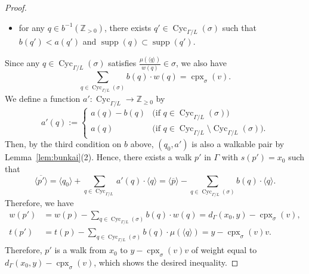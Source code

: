 \begin{proof}
\begin{itemize}
\item
for any $q \in b^{-1}(\mathbb{Z}_{>0})$, 
there exists $q' \in \operatorname{Cyc}_{\Gamma /L}(\sigma)$ 
such that $b(q') < a(q')$ and $\operatorname{supp}(q) \subset \operatorname{supp}(q')$. 
\end{itemize}
Since any $q \in \operatorname{Cyc}_{\Gamma /L}(\sigma)$ satisfies $\frac{\mu(\langle q \rangle)}{w(q)} \in \sigma$, 
we also have 
\[
\sum _{q \in \operatorname{Cyc}_{\Gamma /L}(\sigma)} b(q) \cdot w(q) = \operatorname{cpx}_{\sigma}(v). 
\]
We define a function $a' : \operatorname{Cyc}_{\Gamma /L} \to \mathbb{Z}_{\ge 0}$ by 
\[
a'(q) := 
\begin{cases}
a(q) - b(q) & \text{(if $q \in \operatorname{Cyc}_{\Gamma /L}(\sigma)$)} \\
a(q)  & \text{(if $q \in \operatorname{Cyc}_{\Gamma /L} \setminus \operatorname{Cyc}_{\Gamma /L}(\sigma)$)}. 
\end{cases}
\]
Then, by the third condition on $b$ above, 
$(q_0, a')$ is also a walkable pair by Lemma~\ref{lem:bunkai}(2). 
Hence, there exists a walk $p'$ in $\Gamma$ with $s(p') = x_0$ such that 
\[
\langle \overline{p'} \rangle = \langle q_0 \rangle + \sum _{q \in \operatorname{Cyc}_{\Gamma /L}} a'(q) \cdot \langle q \rangle
= \langle \overline{p} \rangle - \sum _{q \in \operatorname{Cyc}_{\Gamma /L}(\sigma)} b(q) \cdot \langle q \rangle. 
\]
Therefore, we have
\begin{align*}
w(p') 
&= w(p) - \sum _{q \in \operatorname{Cyc}_{\Gamma /L}(\sigma)} b(q) \cdot w(q)
= d_{\Gamma}( x_0, y) - \operatorname{cpx}_{\sigma}(v), \\
t(p') 
&= t(p) - \sum _{q \in \operatorname{Cyc}_{\Gamma /L}(\sigma)} b(q) \cdot  \mu(\langle q \rangle) 
= y  - \operatorname{cpx}_{\sigma}(v)v. 
\end{align*}
Therefore, $p'$ is a walk from $x_0$ to $y - \operatorname{cpx}_{\sigma}(v)v$ of weight 
equal to $d_{\Gamma}( x_0, y) - \operatorname{cpx}_{\sigma}(v)$, which shows the desired inequality. 
\end{proof}

